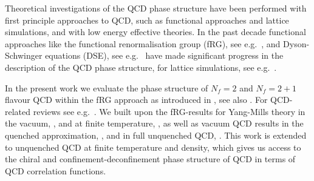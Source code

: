 \documentclass[%
reprint,
superscriptaddress,
showpacs,preprintnumbers,
 amsmath,amssymb,
 aps,
prd,
]{revtex4-1}
\begin{document}
Theoretical investigations of the QCD phase structure have been
performed with first principle approaches to QCD, such as functional
approaches and lattice simulations, and with low energy effective
theories. In the past decade functional approaches like the functional
renormalisation group (fRG), see e.g.\ \cite{Braun:2008pi,
  Braun:2009gm, Mitter:2014wpa, Braun:2014ata, Rennecke:2015eba,
  Fu:2016tey, Cyrol:2016tym, Cyrol:2017ewj, Cyrol:2017qkl,
  Fu:2018qsk}, and Dyson-Schwinger equations (DSE), see e.g.\
\cite{Qin:2010nq, Fischer:2011mz, Fischer:2014ata, Shi:2014zpa,
  Gao:2016qkh, Fischer:2018sdj} have made significant progress in the
description of the QCD phase structure, for lattice simulations, see
e.g.\ \cite{Bazavov:2012vg, Borsanyi:2013hza, Borsanyi:2014ewa,
  Bonati:2015bha, Bellwied:2015rza, Bazavov:2017dus, Bazavov:2017tot,
  Bonati:2018nut, Borsanyi:2018grb, Bazavov:2018mes, Guenther:2018flo,
  Ding:2019prx}.

In the present work we evaluate the phase structure of $N_f=2$ and
$N_f=2+1$ flavour QCD within the fRG approach as introduced in
\cite{Wetterich:1992yh}, see also \cite{Ellwanger:1993mw,
  Morris:1993qb}. For QCD-related reviews see e.g.\
\cite{Berges:2000ew, Pawlowski:2005xe, Schaefer:2006sr, Gies:2006wv,
  Rosten:2010vm, Braun:2011pp, Pawlowski:2014aha}.  We built upon the
fRG-results for Yang-Mills theory in the vacuum, \cite{Cyrol:2016tym},
and at finite temperature, \cite{Cyrol:2017qkl}, as well as vacuum QCD
results in the quenched approximation, \cite{Mitter:2014wpa}, and in
full unquenched QCD, \cite{Braun:2014ata, Rennecke:2015eba,
  Cyrol:2017ewj}. This work is extended to unquenched QCD at finite
temperature and density, which gives us access to the chiral and
confinement-deconfinement phase structure of QCD in terms of QCD
correlation functions.
\end{document}
